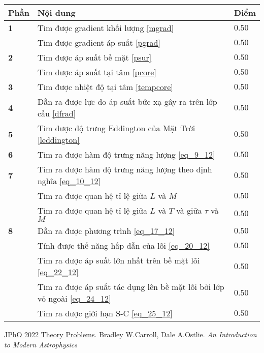 \begin{center}
\begin{tabular}{|>{\centering\arraybackslash}m{1cm}|>{\raggedright\arraybackslash}m{14cm}| >{\centering\arraybackslash}m{1cm}|}
    \hline
    \textbf{Phần} & \textbf{Nội dung} & \textbf{Điểm} \\
    \hline
    \textbf{1} & Tìm được gradient khối lượng \eqref{mgrad} & $0.50$ \\
    \cline{2-3}
    & Tìm được gradient áp suất \eqref{pgrad} & $0.50$ \\
    \hline
    \textbf{2} & Tìm được áp suất bề mặt \eqref{psur} & $0.50$ \\
    \cline{2-3}
    & Tìm được áp suất tại tâm \eqref{pcore} & $0.50$ \\
    \hline
    \textbf{3} & Tìm được nhiệt độ tại tâm \eqref{tempcore} & $0.50$ \\
    \hline
    \textbf{4} & Dẫn ra được lực do áp suất bức xạ gây ra trên lớp cầu \eqref{dfrad} & $0.50$ \\
    \hline
    \textbf{5}
    & Tìm được độ trưng Eddington của Mặt Trời \eqref{leddington} & $0.50$ \\
    \hline
    \textbf{6}
    & Tìm ra được hàm độ trưng năng lượng \eqref{eq_9_12} & $0.50$ \\ 
    \hline
    \textbf{7}
    & Tìm ra được hàm độ trưng năng lượng theo định nghĩa \eqref{eq_10_12} & $0.50$ \\
    \cline{2-3}
    & Tìm ra được quan hệ tỉ lệ giữa $L$ và $M$ & $0.50$\\
    \cline{2-3}
    & Tìm ra được quan hệ tỉ lệ giữa $L$ và $T$ và giữa $\tau$ và $M$ & $0.50$\\
    \hline
    \textbf{8}
    & Dẫn ra được phương trình \eqref{eq_17_12} & $0.50$ \\
    \cline{2-3}
    & Tính được thế năng hấp dẫn của lõi \eqref{eq_20_12} & $0.50$\\
    \cline{2-3}
    & Tìm ra được áp suất lớn nhất trên bề mặt lõi \eqref{eq_22_12} & $0.50$\\
    \cline{2-3}
    & Tìm ra được áp suất tác dụng lên bề mặt lõi bởi lớp vỏ ngoài \eqref{eq_24_12} & $0.50$\\
    \cline{2-3}
    & Tìm ra được giới hạn S-C \eqref{eq_25_12} & $0.50$\\
    
    
    \hline
\end{tabular}
\end{center}  



\begin{thebibliography}{}
 \href{http://www.jpho.jp/syllabus.html}{JPhO 2022 Theory Problems}.
 Bradley W.Carroll, Dale A.Ostlie. \textit{An Introduction to Modern Astrophysics}
\end{thebibliography}


